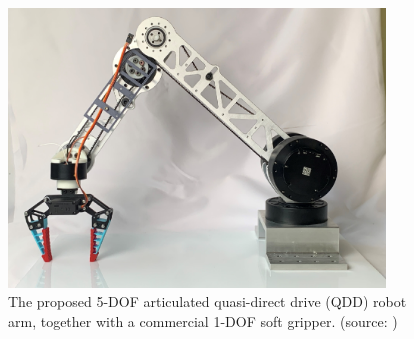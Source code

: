 \begin{figure}[h]
  \centering
  \includegraphics[width=10cm]{images/qddarm.png}
  \caption{The proposed 5-DOF articulated quasi-direct drive (QDD) robot arm,
  together with a commercial 1-DOF soft gripper. (source: \cite{10106520})}
  \label{fig:qddarm}
\end{figure}
\clearpage
\newpage